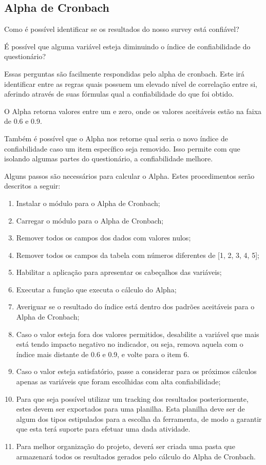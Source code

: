 \subsection{Alpha de Cronbach}
\label{sub:alpha_de_cronbach}
Como é possível identificar se os resultados do nosso survey está confiável?

É possível que alguma variável esteja diminuindo o índice de confiabilidade do questionário?

Essas perguntas são facilmente respondidas pelo alpha de cronbach. Este irá identificar entre as regras quais possuem
um elevado nível de correlação entre si, aferindo através de suas fórmulas qual a confiabilidade do que foi obtido.

O Alpha retorna valores entre um e zero, onde os valores aceitáveis estão na faixa de 0.6 e 0.9.

Também é possível que o Alpha nos retorne qual seria o novo índice de confiabilidade caso um item específico seja removido.
Isso permite com que isolando algumas partes do questionário, a confiabilidade melhore.

Alguns passos são necessários para calcular o Alpha. Estes procedimentos serão descritos a seguir:

\begin{enumerate}
    \item Instalar o módulo para o Alpha de Cronbach;
    \item Carregar o módulo para o Alpha de Cronbach;
    \item Remover todos os campos dos dados com valores nulos;
    \item Remover todos os campos da tabela com números diferentes de [1, 2, 3, 4, 5];
    \item Habilitar a aplicação para apresentar os cabeçalhos das variáveis;
    \item Executar a função que executa o cálculo do Alpha;
    \item Averiguar se o resultado do índice está dentro dos padrões aceitáveis para o Alpha de Cronbach;
    \item Caso o valor esteja fora dos valores permitidos, desabilite a variável que mais está tendo impacto negativo no indicador,
        ou seja, remova aquela com o índice mais distante de 0.6 e 0.9, e volte para o item 6.
    \item Caso o valor esteja satisfatório, passe a considerar para os próximos cálculos apenas as variáveis que foram
        escolhidas com alta confiabilidade;
    \item Para que seja possível utilizar um tracking dos resultados posteriormente, estes devem ser exportados para uma planilha.
        Esta planilha deve ser de algum dos tipos estipulados para a escolha da ferramenta, de modo a garantir que esta terá suporte
        para efetuar uma dada atividade.
    \item Para melhor organização do projeto, deverá ser criada uma pasta que armazenará todos os resultados gerados pelo cálculo do Alpha
        de Cronbach.
\end{enumerate}

